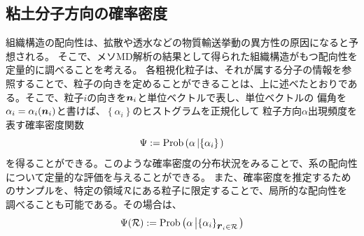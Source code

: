 \subsection{粘土分子方向の確率密度}
組織構造の配向性は、拡散や透水などの物質輸送挙動の異方性の原因になると予想される。
そこで、メソMD解析の結果として得られた組織構造がもつ配向性を定量的に調べることを考える。
各粗視化粒子は、それが属する分子の情報を参照することで、粒子の向きを定めることができることは、上に述べたとおりである。そこで、粒子$i$の向きを$\mbox{\boldmath $n$}_i$と単位ベクトルで表し、単位ベクトルの
偏角を$\alpha_i = \alpha_i( \mbox{\boldmath $n$}_i)$と書けば、$\left\{ \alpha_i \right\}$のヒストグラムを正規化して
粒子方向$\alpha$出現頻度を表す確率密度関数
\begin{equation}
	\Psi:=
	{\rm Prob}
	\left(\alpha \left| \left\{\alpha_i \right\} \right. \right)
	\label{eqn:PDF}
\end{equation}
を得ることができる。このような確率密度の分布状況をみることで、系の配向性について定量的な評価を与えることができる。
また、確率密度を推定するためのサンプルを、特定の領域$\cal R$にある粒子に限定することで、局所的な配向性を
調べることも可能である。その場合は、
\begin{equation}
	\Psi({\cal R}):=
	{\rm Prob} \left(\alpha \left| \left\{\alpha_i \right\}_{\mbox{\boldmath $r$}_i\in {\cal R}} \right. \right)
	\label{eqn:PDF_R}
\end{equation}
